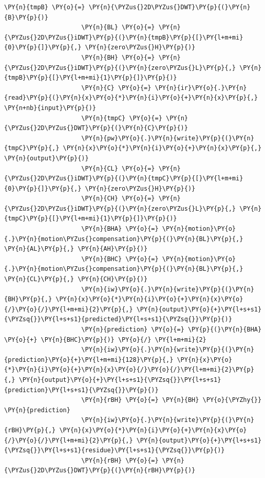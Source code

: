 {\begin{Verbatim}[commandchars=\\\{\}]
                     \PY{n}{tmpB} \PY{o}{=} \PY{n}{\PYZus{}2D\PYZus{}DWT}\PY{p}{(}\PY{n}{B}\PY{p}{)}
                     \PY{n}{BL} \PY{o}{=} \PY{n}{\PYZus{}2D\PYZus{}iDWT}\PY{p}{(}\PY{n}{tmpB}\PY{p}{[}\PY{l+m+mi}{0}\PY{p}{]}\PY{p}{,} \PY{n}{zero\PYZus{}H}\PY{p}{)}
                     \PY{n}{BH} \PY{o}{=} \PY{n}{\PYZus{}2D\PYZus{}iDWT}\PY{p}{(}\PY{n}{zero\PYZus{}L}\PY{p}{,} \PY{n}{tmpB}\PY{p}{[}\PY{l+m+mi}{1}\PY{p}{]}\PY{p}{)}
                     \PY{n}{C} \PY{o}{=} \PY{n}{ir}\PY{o}{.}\PY{n}{read}\PY{p}{(}\PY{n}{x}\PY{o}{*}\PY{n}{i}\PY{o}{+}\PY{n}{x}\PY{p}{,} \PY{n+nb}{input}\PY{p}{)}
                     \PY{n}{tmpC} \PY{o}{=} \PY{n}{\PYZus{}2D\PYZus{}DWT}\PY{p}{(}\PY{n}{C}\PY{p}{)}
                     \PY{n}{pw}\PY{o}{.}\PY{n}{write}\PY{p}{(}\PY{n}{tmpC}\PY{p}{,} \PY{n}{x}\PY{o}{*}\PY{n}{i}\PY{o}{+}\PY{n}{x}\PY{p}{,} \PY{n}{output}\PY{p}{)}
                     \PY{n}{CL} \PY{o}{=} \PY{n}{\PYZus{}2D\PYZus{}iDWT}\PY{p}{(}\PY{n}{tmpC}\PY{p}{[}\PY{l+m+mi}{0}\PY{p}{]}\PY{p}{,} \PY{n}{zero\PYZus{}H}\PY{p}{)}
                     \PY{n}{CH} \PY{o}{=} \PY{n}{\PYZus{}2D\PYZus{}iDWT}\PY{p}{(}\PY{n}{zero\PYZus{}L}\PY{p}{,} \PY{n}{tmpC}\PY{p}{[}\PY{l+m+mi}{1}\PY{p}{]}\PY{p}{)}
                     \PY{n}{BHA} \PY{o}{=} \PY{n}{motion}\PY{o}{.}\PY{n}{motion\PYZus{}compensation}\PY{p}{(}\PY{n}{BL}\PY{p}{,} \PY{n}{AL}\PY{p}{,} \PY{n}{AH}\PY{p}{)}
                     \PY{n}{BHC} \PY{o}{=} \PY{n}{motion}\PY{o}{.}\PY{n}{motion\PYZus{}compensation}\PY{p}{(}\PY{n}{BL}\PY{p}{,} \PY{n}{CL}\PY{p}{,} \PY{n}{CH}\PY{p}{)}
                     \PY{n}{iw}\PY{o}{.}\PY{n}{write}\PY{p}{(}\PY{n}{BH}\PY{p}{,} \PY{n}{x}\PY{o}{*}\PY{n}{i}\PY{o}{+}\PY{n}{x}\PY{o}{/}\PY{o}{/}\PY{l+m+mi}{2}\PY{p}{,} \PY{n}{output}\PY{o}{+}\PY{l+s+s1}{\PYZsq{}}\PY{l+s+s1}{predicted}\PY{l+s+s1}{\PYZsq{}}\PY{p}{)}
                     \PY{n}{prediction} \PY{o}{=} \PY{p}{(}\PY{n}{BHA} \PY{o}{+} \PY{n}{BHC}\PY{p}{)} \PY{o}{/} \PY{l+m+mi}{2}
                     \PY{n}{iw}\PY{o}{.}\PY{n}{write}\PY{p}{(}\PY{n}{prediction}\PY{o}{+}\PY{l+m+mi}{128}\PY{p}{,} \PY{n}{x}\PY{o}{*}\PY{n}{i}\PY{o}{+}\PY{n}{x}\PY{o}{/}\PY{o}{/}\PY{l+m+mi}{2}\PY{p}{,} \PY{n}{output}\PY{o}{+}\PY{l+s+s1}{\PYZsq{}}\PY{l+s+s1}{prediction}\PY{l+s+s1}{\PYZsq{}}\PY{p}{)}
                     \PY{n}{rBH} \PY{o}{=} \PY{n}{BH} \PY{o}{\PYZhy{}} \PY{n}{prediction}
                     \PY{n}{iw}\PY{o}{.}\PY{n}{write}\PY{p}{(}\PY{n}{rBH}\PY{p}{,} \PY{n}{x}\PY{o}{*}\PY{n}{i}\PY{o}{+}\PY{n}{x}\PY{o}{/}\PY{o}{/}\PY{l+m+mi}{2}\PY{p}{,} \PY{n}{output}\PY{o}{+}\PY{l+s+s1}{\PYZsq{}}\PY{l+s+s1}{residue}\PY{l+s+s1}{\PYZsq{}}\PY{p}{)}
                     \PY{n}{rBH} \PY{o}{=} \PY{n}{\PYZus{}2D\PYZus{}DWT}\PY{p}{(}\PY{n}{rBH}\PY{p}{)}

\end{Verbatim}}
